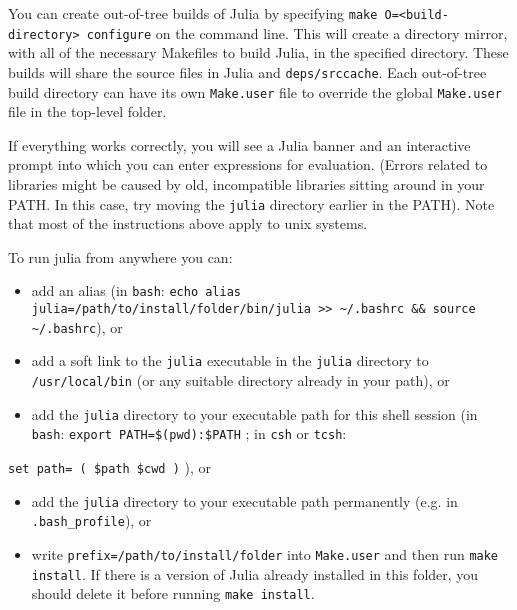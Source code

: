 You can create out-of-tree builds of Julia by specifying \texttt{make O=<build-directory> configure} on the command line. This will create a directory mirror, with all of the necessary Makefiles to build Julia, in the specified directory. These builds will share the source files in Julia and \texttt{deps/srccache}. Each out-of-tree build directory can have its own \texttt{Make.user} file to override the global \texttt{Make.user} file in the top-level folder.



If everything works correctly, you will see a Julia banner and an interactive prompt into which you can enter expressions for evaluation. (Errors related to libraries might be caused by old, incompatible libraries sitting around in your PATH. In this case, try moving the \texttt{julia} directory earlier in the PATH). Note that most of the instructions above apply to unix systems.



To run julia from anywhere you can:



\begin{itemize}
\item add an alias (in \texttt{bash}: \texttt{echo {\textquotedbl}alias julia={\textquotesingle}/path/to/install/folder/bin/julia{\textquotesingle}{\textquotedbl} >> {\textasciitilde}/.bashrc \&\& source {\textasciitilde}/.bashrc}), or


\item add a soft link to the \texttt{julia} executable in the \texttt{julia} directory to \texttt{/usr/local/bin} (or any suitable directory already in your path), or


\item add the \texttt{julia} directory to your executable path for this shell session (in \texttt{bash}: \texttt{export PATH={\textquotedbl}\$(pwd):\$PATH{\textquotedbl}} ; in \texttt{csh} or \texttt{tcsh}:

\end{itemize}


\texttt{set path= ( \$path \$cwd )} ), or



\begin{itemize}
\item add the \texttt{julia} directory to your executable path permanently (e.g. in \texttt{.bash\_profile}), or


\item write \texttt{prefix=/path/to/install/folder} into \texttt{Make.user} and then run \texttt{make install}. If there is a version of Julia already installed in this folder, you should delete it before running \texttt{make install}.

\end{itemize}


